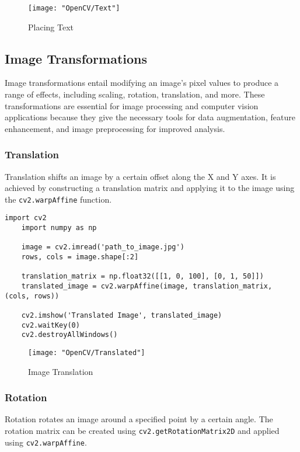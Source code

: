 \begin{figure}[h]
	\centering
	\texttt{[image: "OpenCV/Text"]}
	\caption{Placing Text}\label{Placing Text}
\end{figure}

\subsection {Image Transformations}
Image transformations entail modifying an image's pixel values to produce a range of effects, including scaling, rotation, translation, and more. These transformations are essential for image processing and computer vision applications because they give the necessary tools for data augmentation, feature enhancement, and image preprocessing for improved analysis.

\subsubsection{Translation}

Translation shifts an image by a certain offset along the X and Y axes. It is achieved by constructing a translation matrix and applying it to the image using the \texttt{cv2.warpAffine} function.

\begin{lstlisting}[caption=Translation]
	import cv2
	import numpy as np
	
	image = cv2.imread('path_to_image.jpg')
	rows, cols = image.shape[:2]
	
	translation_matrix = np.float32([[1, 0, 100], [0, 1, 50]])
	translated_image = cv2.warpAffine(image, translation_matrix, (cols, rows))
	
	cv2.imshow('Translated Image', translated_image)
	cv2.waitKey(0)
	cv2.destroyAllWindows()
\end{lstlisting}
\begin{figure}[h]
	\centering
	\texttt{[image: "OpenCV/Translated"]}
	\caption{Image Translation}\label{Image Translation}
\end{figure}

\subsubsection{Rotation}

Rotation rotates an image around a specified point by a certain angle. The rotation matrix can be created using \texttt{cv2.getRotationMatrix2D} and applied using \texttt{cv2.warpAffine}.\cite{flaskrestfuldocumentation:2024}

